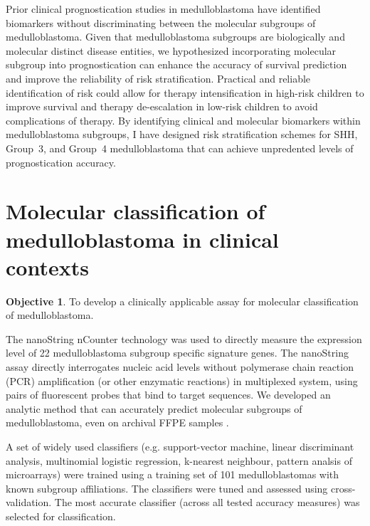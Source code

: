 \documentclass[11pt,letterpaper]{article}
\theoremstyle{definition}
\newtheorem*{objective}{Objective}
\begin{document}
Prior clinical prognostication studies in medulloblastoma have identified biomarkers without discriminating between the molecular subgroups of medulloblastoma. Given that medulloblastoma subgroups are biologically and molecular distinct disease entities, we hypothesized incorporating molecular subgroup into prognostication can enhance the accuracy of survival prediction and improve the reliability of risk stratification. Practical and reliable identification of risk could allow for therapy intensification in high-risk children to improve survival and therapy de-escalation in low-risk children to avoid complications of therapy. By identifying clinical and molecular biomarkers within medulloblastoma subgroups, I have designed risk stratification schemes for SHH, Group~3, and Group~4 medulloblastoma that can achieve unpredented levels of prognostication accuracy.


\clearpage


\section{Molecular classification of medulloblastoma in clinical contexts}

\begin{objective}
To develop a clinically applicable assay for molecular classification of medulloblastoma.
\end{objective}

The nanoString nCounter technology  was used to directly measure the expression level of 22 medulloblastoma subgroup specific signature genes. The nanoString assay directly interrogates nucleic acid levels without polymerase chain reaction (PCR) amplification (or other enzymatic reactions) in multiplexed system, using pairs of fluorescent probes that bind to target sequences. We developed an analytic method that can accurately predict molecular subgroups of medulloblastoma, even on archival FFPE samples .

A set of widely used classifiers (e.g. support-vector machine, linear discriminant analysis, multinomial logistic regression, k-nearest neighbour, pattern analsis of microarrays) were trained using a training set of 101 medulloblastomas with known subgroup affiliations. The classifiers were tuned and assessed using cross-validation. The most accurate classifier (across all tested accuracy measures) was selected for classification.
\end{document}
